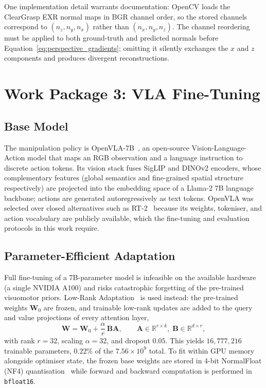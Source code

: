 One implementation detail warrants documentation: OpenCV loads the ClearGrasp EXR normal maps in BGR channel order, so the stored channels correspond to $(n_z, n_y, n_x)$ rather than $(n_x, n_y, n_z)$. The channel reordering must be applied to both ground-truth and predicted normals before Equation~\ref{eq:perspective_gradients}; omitting it silently exchanges the $x$ and $z$ components and produces divergent reconstructions.

\section{Work Package 3: VLA Fine-Tuning}
\label{sec:wp3}

\subsection{Base Model}
\label{subsec:base_model}

The manipulation policy is OpenVLA-7B~\citep{kim2024}, an open-source Vision-Language-Action model that maps an RGB observation and a language instruction to discrete action tokens. Its vision stack fuses SigLIP and DINOv2 encoders, whose complementary features (global semantics and fine-grained spatial structure respectively) are projected into the embedding space of a Llama-2 7B language backbone; actions are generated autoregressively as text tokens. OpenVLA was selected over closed alternatives such as RT-2~\citep{zitkovich2023} because its weights, tokeniser, and action vocabulary are publicly available, which the fine-tuning and evaluation protocols in this work require.

\subsection{Parameter-Efficient Adaptation}
\label{subsec:lora}

Full fine-tuning of a 7B-parameter model is infeasible on the available hardware (a single NVIDIA A100) and risks catastrophic forgetting of the pre-trained visuomotor priors. Low-Rank Adaptation~\citep{hu2021lora} is used instead: the pre-trained weights $\mathbf{W}_0$ are frozen, and trainable low-rank updates are added to the query and value projections of every attention layer,
\begin{equation}
    \mathbf{W} = \mathbf{W}_0 + \frac{\alpha}{r}\,\mathbf{B}\mathbf{A},
    \qquad \mathbf{A} \in \mathbb{R}^{r \times k},\;
    \mathbf{B} \in \mathbb{R}^{d \times r},
\end{equation}
with rank $r = 32$, scaling $\alpha = 32$, and dropout $0.05$. This yields $16{,}777{,}216$ trainable parameters, $0.22\%$ of the $7.56 \times 10^{9}$ total. To fit within GPU memory alongside optimiser state, the frozen base weights are stored in 4-bit NormalFloat (NF4) quantisation~\citep{dettmers2023qlora} while forward and backward computation is performed in \texttt{bfloat16}.

